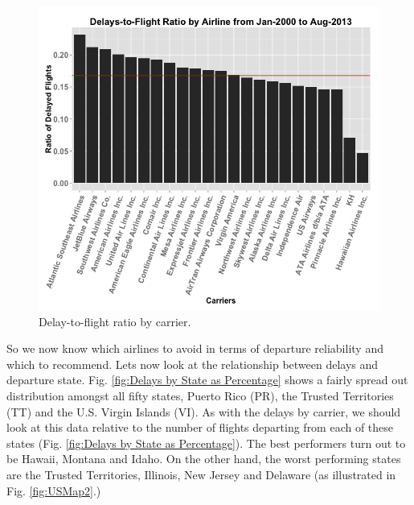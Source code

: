 \documentclass[11pt,twoside,titlepage]{article}
\begin{document}
\begin{figure}[h!]
        \centering
                \includegraphics[width=16cm]{Delayed_by_Airline2.png}
        \caption{Delay-to-flight ratio by carrier.}\label{fig:Delays by Carrier as Percentage}
\end{figure}

So we now know which airlines to avoid in terms of departure reliability and which to recommend. Lets now look at the relationship between delays and departure state. Fig. \ref{fig:Delays by State as Percentage} shows a fairly spread out distribution amongst all fifty states, Puerto Rico (PR), the Trusted Territories (TT) and the U.S. Virgin Islands (VI). As with the delays by carrier, we should look at this data relative to the number of flights departing from each of these states (Fig. \ref{fig:Delays by State as Percentage}). The best performers turn out to be Hawaii, Montana and Idaho. On the other hand, the worst performing states are the Trusted Territories, Illinois, New Jersey and Delaware (as illustrated in Fig. \ref{fig:USMap2}.) 
\end{document}
